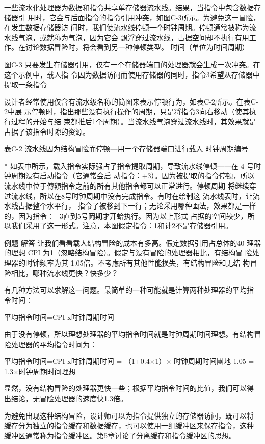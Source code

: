 一些流水化处理器为数据和指令共享单存储器流水线。结果，当指令中包含数据存储器引
用时，它会与后面指令的指令引用冲突，如图C-3所示。为避免这一冒险，在发生数据存储器访
问时，我们使流水线停顿一个时钟周期。停顿通常被称为流水线气泡，或就称为气泡，因为它会
飘浮穿过流水线，占据空间却不执行有用工作。在讨论数据冒险时，将会看到另一种停顿类型。
时间（单位为时间周期）

图C-3 只要发生存储器引用，仅有一个存储器端口的处理器就会生成一次冲突。在这个示例中，载人指
令因为数据访问而使用存储器的同时，指令3希望从存储器中提取一条指令

设计者经常使用仅含有流水级名称的简图来表示停顿行为，如表C-2所示。在表C-2中展
示停顿时，指出那些没有执行操作的周期，只是将指令3向右移动（使其执行过程的开始与结
束都推后1个周期）。当流水线气泡穿过流水线时，其效果就是占据了该指令时隙的资源。

表C-2 流水线因为结构冒险而停顿—用一个存储器端口进行载入
时钟周期编号

* 如表中所示，载入指令实际强占了指令提取周期，导致流水线停顿一一在 4 号时钟周期没有启动指令（它通常会启
动指令：+3）。因为被提取的指令停顿，所以流水线中位于傳額指令之前的所有其他指令都可以正常进行。停顿周期
将继续穿过流水线，所以在8号时钟周期中没有完成指令。有时在绘制这 流水线表时，让流水线占据整个水平行，
指令了被移到下一行；无论采用哪种画法，效果都是一样的，因为指令：+3直到5号岡期才开蛤执行。因为以上形式
占据的空间较少，所以我们采用了这一形式。注意，本图假定指令：1和计2不是存储器引用。

例题
解答
让我们看看载人结构冒险的成本有多高。假定数据引用占总体的40%
理器的理想 CPI 为1（忽略结构冒险）。假定与没有冒险的处理器相比，有结构冒
险处理器的时钟频率为其 1.05倍。不考虑所有其他性能损失，有结构冒险和无结
构冒险相比，哪种流水线更快？快多少？

有几种方法可以求解这一问题。最简单的一种可能就是计算两种处理器的平均指
令时间：

平均指令时间=CPI x时钟周期时间

由于没有停顿，所以理想处理器的平均指令时间就是时钟周期时间理想。有结构冒
险处理器的平均指令时间为：

平均指令时间=CPI x时钟周期时间
= （1+0.4×1）× 时钟周期时间團地
1.05
= 1.3×时钟周期时间理想

显然，没有结构冒险的处理器更快一些；根据平均指令时间的比值，我们可以得
出结论，无冒险处理器的速度快1.3倍。

为避免出现这种结构冒险，设计师可以为指令提供独立的存储器访问，既可以将
缓存分为独立的指令缓存和数据缓存，也可以使用一组缓冲区来保存指令，这种
缓冲区通常称为指令缓冲区。第5章讨论了分离缓存和指令缓冲区的思想。

